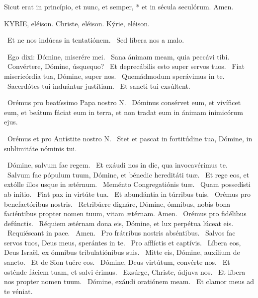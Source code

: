 Sicut erat in princípio, et nunc, et semper, * et in sécula seculórum. Amen.




KYRIE, eléison. Christe, eléison. Kýrie, eléison.

 \V\ Et ne nos indúcas in tentatiónem. \R\ Sed líbera nos a malo.

\V\ Ego dixi: Dómine, miserére mei. \R\ Sana ánimam meam, quia peccávi tibi. \V\ Convértere, Dómine, úsquequo? \R\ Et deprecábilis esto super servos tuos. \V\ Fiat misericórdia tua, Dómine, super nos. \R\ Quemádmodum sperávimus in te. \V\ Sacerdótes tui induántur justítiam. \R\ Et sancti tui exsúltent.

\V\ Orémus pro beatíssimo Papa nostro N. \R\ Dóminus consérvet eum, et vivíficet eum, et beátum fáciat eum in terra, et non tradat eum in ánimam inimicórum ejus.

\V\ Orémus et pro Antístite nostro N. \R\ Stet et pascat in fortitúdine tua, Dómine, in sublimitáte nóminis tui.


\V\ Dómine, salvum fac regem. \R\ Et exáudi nos in die, qua invocavérimus te. \V\ Salvum fac pópulum tuum, Dómine, et bénedic hereditáti tuæ. \R\ Et rege eos, et extólle illos usque in ætérnum. \V\ Meménto Congregatiónis tuæ. \R\ Quam possedísti ab inítio. \V\ Fiat pax in virtúte tua. \R\ Et abundántia in túrribus tuis. \V\ Orémus pro benefactóribus nostris. \R\ Retribúere dignáre, Dómine, ómnibus, nobis bona faciéntibus propter nomen tuum, vitam ætérnam. Amen. \V\ Orémus pro fidélibus defúnctis. \R\ Réquiem ætérnam dona eis, Dómine, et lux perpétua lúceat eis. \V\ Requiéscant in pace. \R\ Amen. \V\ Pro frátribus nostris abséntibus. \R\ Salvos fac servos tuos, Deus meus, sperántes in te. \V\ Pro afflíctis et captívis. \R\ Líbera eos, Deus Israël, ex ómnibus tribulatiónibus suis. \V\ Mitte eis, Dómine, auxílium de sancto. \R\ Et de Sion tuére eos. \V\ Dómine, Deus virtútum, convérte nos. \R\ Et osténde fáciem tuam, et salvi érimus. \V\ Exsúrge, Christe, ádjuva nos. \R\ Et líbera nos propter nomen tuum. \V\ Dómine, exáudi oratiónem meam. \R\ Et clamor meus ad te véniat.

